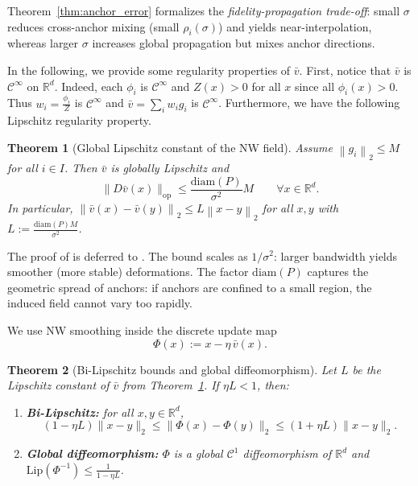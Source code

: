 \documentclass{article} %
\newcommand{\R}{\mathbb{R}}
\newcommand{\diam}{\mathrm{diam}}
\newcommand*{\norm}[1]{\left\|#1\right\|}
\theoremstyle{plain}
\newtheorem{theorem}{Theorem}[section]
\theoremstyle{definition}
\theoremstyle{remark}
\begin{document}
Theorem~\ref{thm:anchor_error} formalizes the \emph{fidelity-propagation trade-off}: small $\sigma$ reduces cross-anchor mixing (small $\rho_i(\sigma)$) and yields near-interpolation, whereas larger $\sigma$ increases global propagation but mixes anchor directions.

In the following, we provide some regularity properties of $\bar v$. First, notice that $\bar v$ is $\mathcal{C}^\infty$ on $\R^d$. Indeed, each $\phi_i$ is $\mathcal{C}^\infty$ and $Z(x) > 0$ for all $x$ since all $\phi_i(x) > 0$. Thus $w_i = \frac{\phi_i}{Z}$ is $\mathcal{C}^\infty$ and $\bar v = \sum_i w_i g_i$ is $\mathcal{C}^\infty$. Furthermore, we have the following Lipschitz regularity property.

\begin{theorem}[Global Lipschitz constant of the NW field]
\label{thm:nw_lipschitz}
Assume $\norm{g_i}_2\le M$ for all $i \in I$. Then $\bar v$ is globally Lipschitz and
\begin{equation}
\label{eq:nw_lipschitz}
    \|D\bar v(x)\|_{\mathrm{op}} \le \frac{\diam(P)}{\sigma^2} M \qquad \forall x \in \R^d.
\end{equation}
In particular, $\norm{\bar v(x) - \bar v(y)}_2 \le L \norm{x-y}_2$ for all $x, y$ with $L := \frac{\diam(P) M}{\sigma^2}$.
\end{theorem}


The proof of  is deferred to . The bound scales as $1 / \sigma^2$: larger bandwidth yields smoother (more stable) deformations. The factor $\diam(P)$ captures the geometric spread of anchors: if anchors are confined to a small region, the induced
field cannot vary too rapidly.

\iffalse
We use NW smoothing inside the discrete update map
\begin{equation}
\label{eq:Phi_def}
\Phi(x) := x - \eta\,\bar v(x).
\end{equation}

\begin{theorem}[Bi-Lipschitz bounds and global diffeomorphism]
\label{thm:bilipschitz_diffeo}
Let $L$ be the Lipschitz constant of $\bar v$ from Theorem~\ref{thm:nw_lipschitz}.
If $\eta L<1$, then:
\begin{enumerate}
\item \textbf{Bi-Lipschitz:} for all $x,y\in\R^d$,
    \begin{equation}
    \label{eq:bilipschitz}
    (1-\eta L)\|x-y\|_2 \le \|\Phi(x)-\Phi(y)\|_2 \le (1+\eta L)\|x-y\|_2 .
    \end{equation}
\item \textbf{Global diffeomorphism:} $\Phi$ is a global $\mathcal{C}^1$ diffeomorphism of $\R^d$ and
$\mathrm{Lip}(\Phi^{-1})\le \frac{1}{1-\eta L}$.
\end{enumerate}
\end{theorem}
\end{document}
